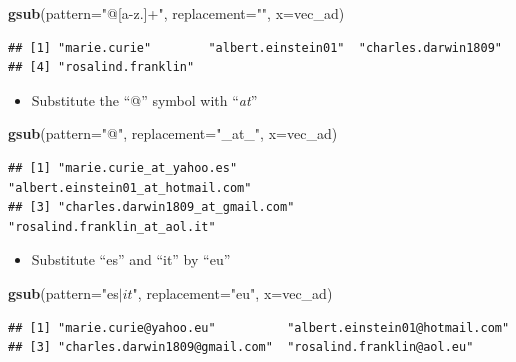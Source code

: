 \documentclass[]{book}
\newenvironment{Shaded}{\begin{snugshade}}{\end{snugshade}}
\newcommand{\DataTypeTok}[1]{\textcolor[rgb]{0.13,0.29,0.53}{#1}}
\newcommand{\KeywordTok}[1]{\textcolor[rgb]{0.13,0.29,0.53}{\textbf{#1}}}
\newcommand{\NormalTok}[1]{#1}
\newcommand{\StringTok}[1]{\textcolor[rgb]{0.31,0.60,0.02}{#1}}
\providecommand{\tightlist}{%
  \setlength{\itemsep}{0pt}\setlength{\parskip}{0pt}}
\begin{document}
\begin{Shaded}
\begin{Highlighting}[]
\KeywordTok{gsub}\NormalTok{(}\DataTypeTok{pattern=}\StringTok{"@[a-z.]+"}\NormalTok{,}
        \DataTypeTok{replacement=}\StringTok{""}\NormalTok{,}
        \DataTypeTok{x=}\NormalTok{vec_ad)}
\end{Highlighting}
\end{Shaded}

\begin{verbatim}
## [1] "marie.curie"        "albert.einstein01"  "charles.darwin1809"
## [4] "rosalind.franklin"
\end{verbatim}

\begin{itemize}
\tightlist
\item
  Substitute the ``@'' symbol with ``\emph{at}''
\end{itemize}

\begin{Shaded}
\begin{Highlighting}[]
\KeywordTok{gsub}\NormalTok{(}\DataTypeTok{pattern=}\StringTok{"@"}\NormalTok{,}
        \DataTypeTok{replacement=}\StringTok{"_at_"}\NormalTok{,}
        \DataTypeTok{x=}\NormalTok{vec_ad)}
\end{Highlighting}
\end{Shaded}

\begin{verbatim}
## [1] "marie.curie_at_yahoo.es"          "albert.einstein01_at_hotmail.com"
## [3] "charles.darwin1809_at_gmail.com"  "rosalind.franklin_at_aol.it"
\end{verbatim}

\begin{itemize}
\tightlist
\item
  Substitute ``es'' and ``it'' by ``eu''
\end{itemize}

\begin{Shaded}
\begin{Highlighting}[]
\KeywordTok{gsub}\NormalTok{(}\DataTypeTok{pattern=}\StringTok{"es$|it$"}\NormalTok{, }
    \DataTypeTok{replacement=}\StringTok{"eu"}\NormalTok{, }
    \DataTypeTok{x=}\NormalTok{vec_ad)}
\end{Highlighting}
\end{Shaded}

\begin{verbatim}
## [1] "marie.curie@yahoo.eu"          "albert.einstein01@hotmail.com"
## [3] "charles.darwin1809@gmail.com"  "rosalind.franklin@aol.eu"
\end{verbatim}
\end{document}
